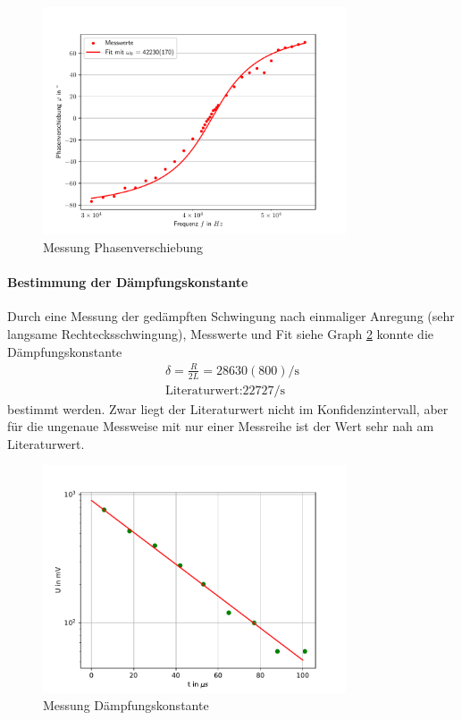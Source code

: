\documentclass[11pt, a4paper]{article}
\begin{document}
    \begin{figure}
        \centering
        \includegraphics[width=0.8\textwidth]{schwphase.pdf}
        \caption{Messung Phasenverschiebung}
        \label{fig:schwphas}
    \end{figure}

    \paragraph{Bestimmung der Dämpfungskonstante}
    Durch eine Messung der gedämpften Schwingung nach einmaliger Anregung (sehr langsame Rechtecksschwingung), Messwerte und Fit siehe Graph \ref{fig:expfit} konnte die Dämpfungskonstante
    \begin{align}
        \delta = \frac{R}{2L} = 28 630(800) \si{\per\second} \\
        \text{Literaturwert:} 22727 \si{\per\second}
    \end{align}
    bestimmt werden. Zwar liegt der Literaturwert nicht im Konfidenzintervall, aber für die ungenaue Messweise mit nur einer Messreihe ist der Wert sehr nah am Literaturwert.

    \begin{figure}
        \centering
        \includegraphics[width=0.8\textwidth]{expfit2.pdf}
        \caption{Messung Dämpfungskonstante}
        \label{fig:expfit}
    \end{figure}
\end{document}
